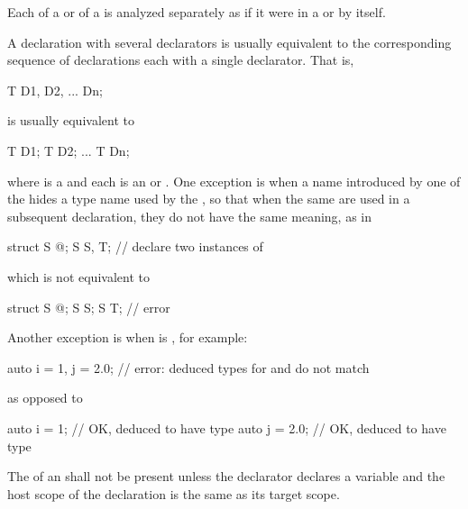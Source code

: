 \pnum
Each  of a 
or  of a 
is analyzed separately as if it were in a
 or  by itself.
\begin{note}
A declaration with several declarators is usually equivalent to the corresponding
sequence of declarations each with a single declarator. That is,
\begin{codeblock}
T D1, D2, ... Dn;
\end{codeblock}
is usually equivalent to
\begin{codeblock}
T D1; T D2; ... T Dn;
\end{codeblock}
where  is a 
and each  is
an  or .
One exception is when a name introduced by one of the
 hides a type name used by the
, so that when the same
 are used in a subsequent declaration,
they do not have the same meaning, as in
\begin{codeblock}
struct S { @\commentellip@ };
S S, T;                 // declare two instances of 
\end{codeblock}
which is not equivalent to
\begin{codeblock}
struct S { @\commentellip@ };
S S;
S T;                    // error
\end{codeblock}
Another exception is when  is ,
for example:
\begin{codeblock}
auto i = 1, j = 2.0;    // error: deduced types for  and  do not match
\end{codeblock}
as opposed to
\begin{codeblock}
auto i = 1;             // OK,  deduced to have type 
auto j = 2.0;           // OK,  deduced to have type 
\end{codeblock}
\end{note}

\pnum
The  of an 
shall not be present unless
the declarator declares a variable and
the host scope of the declaration
is the same as its target scope.

